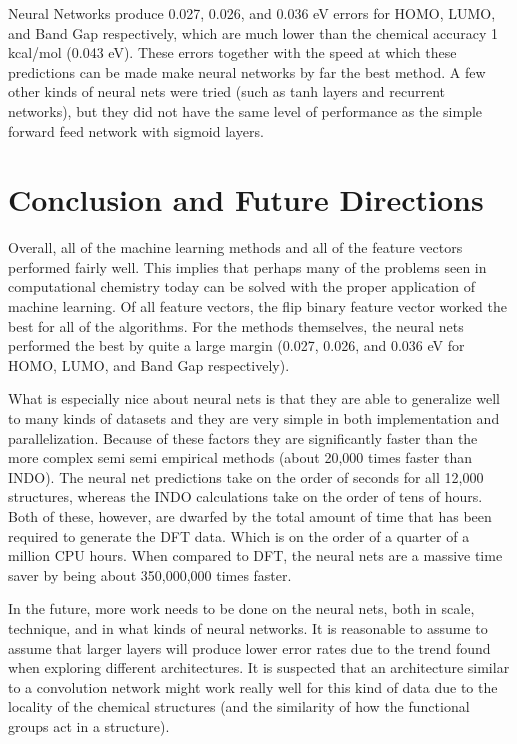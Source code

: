 \documentclass[10pt, oneside]{article}   	%
\begin{document}
Neural Networks produce 0.027, 0.026, and 0.036 eV errors for HOMO, LUMO, and Band Gap respectively, which are much lower than the chemical accuracy 1 kcal/mol (0.043 eV). These errors together with the speed at which these predictions can be made make neural networks by far the best method. A few other kinds of neural nets were tried (such as tanh layers and recurrent networks), but they did not have the same level of performance as the simple forward feed network with sigmoid layers.


\section{Conclusion and Future Directions}

Overall, all of the machine learning methods and all of the feature vectors performed fairly well. This implies that perhaps many of the problems seen in computational chemistry today can be solved with the proper application of machine learning. Of all feature vectors, the flip binary feature vector worked the best for all of the algorithms. For the methods themselves, the neural nets performed the best by quite a large margin (0.027, 0.026, and 0.036 eV for HOMO, LUMO, and Band Gap respectively).

What is especially nice about neural nets is that they are able to generalize well to many kinds of datasets and they are very simple in both implementation and parallelization. Because of these factors they are significantly faster than the more complex semi semi empirical methods (about 20,000 times faster than INDO). The neural net predictions take on the order of seconds for all 12,000 structures, whereas the INDO calculations take on the order of tens of hours. Both of these, however, are dwarfed by the total amount of time that has been required to generate the DFT data. Which is on the order of a quarter of a million CPU hours. When compared to DFT, the neural nets are a massive time saver by being about 350,000,000 times faster.

In the future, more work needs to be done on the neural nets, both in scale, technique, and in what kinds of neural networks. It is reasonable to assume to assume that larger layers will produce lower error rates due to the trend found when exploring different architectures. It is suspected that an architecture similar to a convolution network might work really well for this kind of data due to the locality of the chemical structures (and the similarity of how the functional groups act in a structure).
\end{document}
